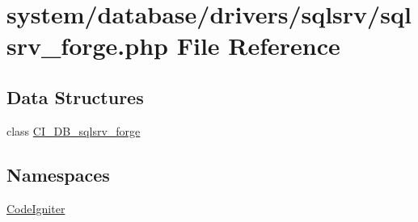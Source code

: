 \hypertarget{sqlsrv__forge_8php}{}\section{system/database/drivers/sqlsrv/sqlsrv\+\_\+forge.php File Reference}
\label{sqlsrv__forge_8php}
\subsection*{Data Structures}
\begin{DoxyCompactItemize}
\item 
class \mbox{\hyperlink{class_c_i___d_b__sqlsrv__forge}{C\+I\+\_\+\+D\+B\+\_\+sqlsrv\+\_\+forge}}
\end{DoxyCompactItemize}
\subsection*{Namespaces}
\begin{DoxyCompactItemize}
\item 
 \mbox{\hyperlink{namespace_code_igniter}{Code\+Igniter}}
\end{DoxyCompactItemize}
